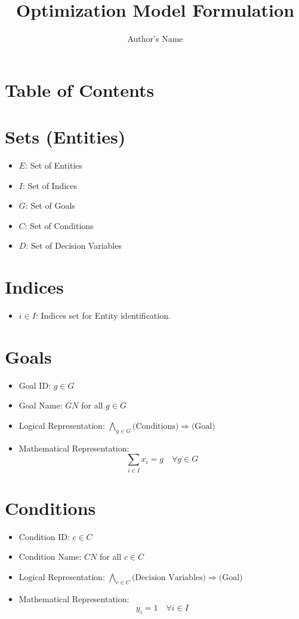 \documentclass{article}
\title{\textbf{Optimization Model Formulation}}
\author{Author's Name}
\date{}
\begin{document}
\maketitle

\section*{Table of Contents}
\tableofcontents

\section{Sets (Entities)}
\begin{itemize}
    \item $E$: Set of Entities
    \item $I$: Set of Indices
    \item $G$: Set of Goals
    \item $C$: Set of Conditions
    \item $D$: Set of Decision Variables
\end{itemize}

\section{Indices}
\begin{itemize}
    \item $i \in I$: Indices set for Entity identification.
\end{itemize}

\section{Goals}
\begin{itemize}
    \item Goal ID: $g \in G$
    \item Goal Name: $GN$ for all $g \in G$
    \item Logical Representation: $\bigwedge_{g \in G} \text{(Conditions)} \Rightarrow \text{(Goal)}$
    \item Mathematical Representation:
    \[
        \sum_{i \in I} x_i = g \quad \forall g \in G
    \]
\end{itemize}

\section{Conditions}
\begin{itemize}
    \item Condition ID: $c \in C$
    \item Condition Name: $CN$ for all $c \in C$
    \item Logical Representation: $\bigwedge_{c \in C} \text{(Decision Variables)} \Rightarrow \text{(Goal)}$
    \item Mathematical Representation:
    \[
        y_i = 1 \quad \forall i \in I
    \]
\end{itemize}
\end{document}
